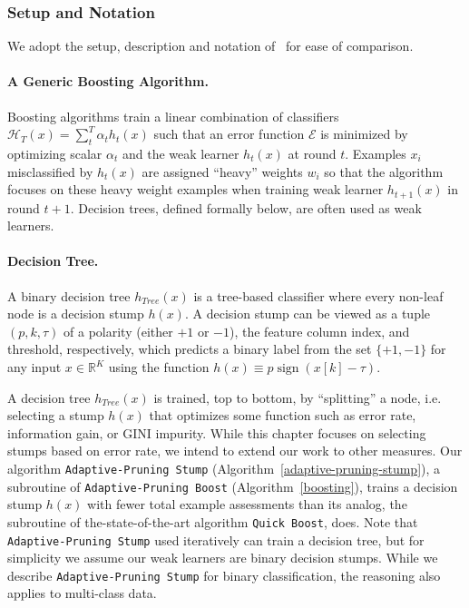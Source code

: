 \subsubsection{Setup and Notation}
We adopt the setup, 
description and notation of~\citet{icml2013_appel13} for ease of
comparison.  

\paragraph {A Generic Boosting Algorithm.}
Boosting algorithms train a linear combination of classifiers
$\mathcal{H}_T(x)=\sum^T_t {\alpha_t h_t(x)}$
such that an error function $\mathcal{E}$ is minimized by optimizing scalar
$\alpha_t$ and the weak learner $h_t(x)$ at round $t$.
Examples $x_i$ misclassified by $h_t(x)$ are assigned ``heavy'' weights $w_i$
so that the algorithm focuses on these heavy weight examples when training weak
learner $h_{t+1}(x)$ in round $t+1$.
Decision trees, defined formally below, are often used as weak learners.

\paragraph {Decision Tree.}  A binary decision tree $h_{\textit{Tree}}(x)$ is a
tree-based classifier where every non-leaf node is a decision stump
$h(x)$.  A decision stump can be viewed as a tuple $(p, k, \tau)$ of a
polarity (either $+1$ or $-1$), the feature column index, and
threshold, respectively, which predicts a binary label from the set
$\{+1, -1\}$ for any input $x \in \mathbb{R}^K$ using the function
$h(x) \equiv p\mathop{\mathrm{sign}}(x[k] - \tau)$.

A decision tree $h_{\textit{Tree}}(x)$ is trained, top to bottom, by
``splitting'' a node, i.e. selecting a stump $h(x)$ that optimizes
some function such as error rate, information gain, or GINI impurity.  
While this chapter focuses on selecting stumps based on
error rate, we intend to extend our work to other measures.
Our algorithm \texttt{Adaptive-Pruning Stump} (Algorithm~\ref{adaptive-pruning-stump}), a subroutine of \texttt{Adaptive-Pruning Boost} (Algorithm~\ref{boosting}), trains a decision stump $h(x)$ with
fewer total example assessments than its analog, the subroutine of the-state-of-the-art algorithm
\texttt{Quick Boost}, does. Note that \texttt{Adaptive-Pruning Stump} used iteratively can train a decision tree, but for simplicity we assume our weak learners are binary decision stumps.
While we describe \texttt{Adaptive-Pruning Stump} for
binary classification, the reasoning also applies to multi-class data.


